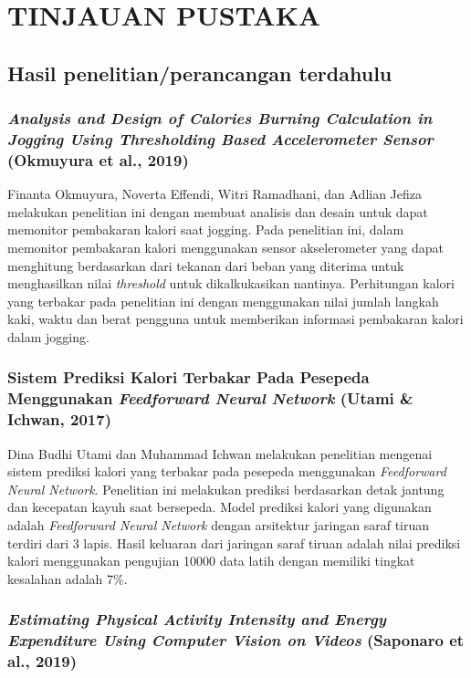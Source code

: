 \chapter{TINJAUAN PUSTAKA}

\section{Hasil penelitian/perancangan terdahulu}

\subsection{\emph{Analysis and Design of Calories Burning Calculation in Jogging Using Thresholding Based Accelerometer Sensor }(Okmuyura et al., 2019)}
  
Finanta Okmuyura, Noverta Effendi, Witri Ramadhani, dan Adlian Jefiza melakukan penelitian ini dengan membuat analisis dan desain untuk dapat memonitor pembakaran kalori saat jogging. Pada penelitian ini, dalam memonitor pembakaran kalori menggunakan sensor akselerometer yang dapat menghitung berdasarkan dari tekanan dari beban yang diterima untuk menghasilkan nilai \emph{threshold} untuk dikalkukasikan nantinya. Perhitungan kalori yang terbakar pada penelitian ini dengan menggunakan nilai jumlah langkah kaki, waktu dan berat pengguna untuk memberikan informasi pembakaran kalori dalam jogging.
  
\subsection{Sistem Prediksi Kalori Terbakar Pada Pesepeda Menggunakan \emph{Feedforward Neural Network} (Utami \& Ichwan, 2017)}
  
Dina Budhi Utami dan Muhammad Ichwan melakukan penelitian mengenai sistem prediksi kalori yang terbakar pada pesepeda menggunakan \emph{Feedforward Neural Network}. Penelitian ini melakukan prediksi berdasarkan detak jantung dan kecepatan kayuh saat bersepeda. Model prediksi kalori yang digunakan adalah \emph{Feedforward Neural Network} dengan arsitektur jaringan saraf tiruan terdiri dari 3 lapis. Hasil keluaran dari jaringan saraf tiruan adalah nilai prediksi kalori menggunakan pengujian 10000 data latih dengan memiliki tingkat kesalahan adalah 7\%.

\subsection{\emph{Estimating Physical Activity Intensity and Energy Expenditure Using Computer Vision on Videos} (Saponaro et al.,  2019)}
  
